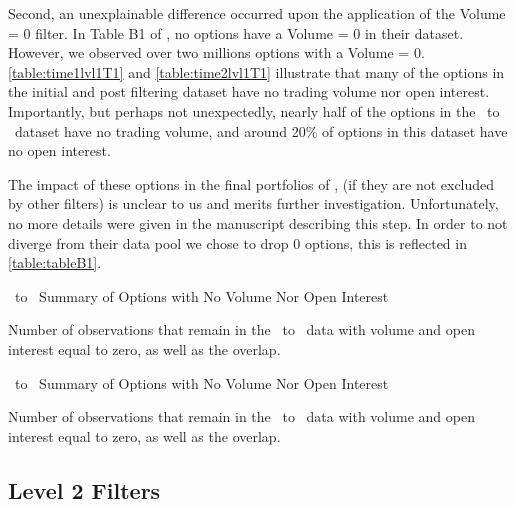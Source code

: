 Second, an unexplainable difference occurred upon the application of the Volume = 0 filter. In Table B1 of \citet{constantinides2013}, no options have a Volume = 0 in their dataset. However, we observed over two millions options with a Volume = 0.   
\autoref{table:time1lvl1T1} and \autoref{table:time2lvl1T1} illustrate that many of the options in the initial and post filtering dataset have no trading volume nor open interest. Importantly, but perhaps not unexpectedly, nearly half of the options in the \STARTONE\ to \ENDONE\ dataset have no trading volume, and around 20\% of options in this dataset have no open interest. 

The impact of these options in the final portfolios of \citet{constantinides2013}, (if they are not excluded by other filters) is unclear to us and merits further investigation. Unfortunately, no more details were given in the manuscript describing this step. In order to not diverge from their data pool we chose to drop 0 options, this is reflected in \autoref{table:tableB1}.


\vspace{20pt}
\begin{table}[H]

  \centering
  \caption{\STARTONE\ to \ENDONE\ Summary of Options with No Volume Nor Open Interest}
  
  
  \caption*{
    Number of observations that remain in the \STARTONE\ to \ENDONE\ data with volume and open interest equal to zero, as well as the overlap. 
  }
  \label{table:time1lvl1T1}
\end{table}
  
  
\vspace{20pt}
\begin{table}[H]
  \centering
  \caption{\STARTTWO\ to \ENDONE\ Summary of Options with No Volume Nor Open Interest}
  
  
  \caption*{
    Number of observations that remain in the \STARTTWO\ to \ENDTWO\ data with volume and open interest equal to zero, as well as the overlap. 
  }
  \label{table:time2lvl1T1}
\end{table}

\clearpage

\subsection {Level 2 Filters}
